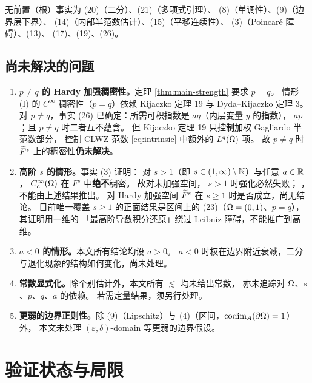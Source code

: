 无前置（根）事实为
(20)（二分）、(21)（多项式引理）、
(8)（单调性）、(9)（边界层下界）、
(14)（内部半范数估计）、(15)（平移连续性）、
(3)（Poincaré 障碍）、(13)、
(17)、(19)、(26)。

\subsection{尚未解决的问题}

\begin{enumerate}
\item \textbf{$p\neq q$ 的 Hardy 加强稠密性。}定理 \ref{thm:main-strength} 要求 $p=q$。
情形 (I) 的 $C^\infty$ 稠密性（$p=q$）依赖 Kijaczko 定理 19 与 Dyda--Kijaczko 定理 3。
对 $p\neq q$，事实 (26) 已确定：所需可积指数是 $aq$（内层变量 $y$ 的指数），
 $ap$；且 $p\neq q$ 时二者互不蕴含。
但 Kijaczko 定理 19 只控制加权 Gagliardo 半范数部分，
控制 CLWZ 范数 \eqref{eq:intrinsic} 中额外的 $L^q(\Omega)$ 项。
故 $p\neq q$ 时 $\widetilde F^s$ 上的稠密性\textbf{仍未解决}。

\item \textbf{高阶 $s$ 的情形。}事实 (3) 证明：
对 $s>1$（即 $s\in(1,\infty)\setminus\mathbb{N}$）与任意 $a\in\mathbb{R}$，
$C_c^\infty(\Omega)$ 在 $F^s$ 中\textbf{绝不}稠密。
故对未加强空间， $s>1$ 时强化必然失败；
，不能由上述结果推出。
对 Hardy 加强空间 $\widetilde F^s$ 在 $s\ge1$ 时是否成立，尚无结论。
目前唯一覆盖 $s\ge1$ 的正面结果是区间上的
(23)（$\Omega=(0,1)$、$p=q$），其证明用一维的
「最高阶导数积分还原」绕过 Leibniz 障碍，不能推广到高维。

\item \textbf{$a<0$ 的情形。}本文所有结论均设 $a>0$。
$a<0$ 时权在边界附近衰减，二分与退化现象的结构如何变化，尚未处理。

\item \textbf{常数显式化。}除个别估计外，本文所有 $\lesssim$ 均未给出常数，
亦未追踪对 $\Omega$、$s$、$p$、$q$、$a$ 的依赖。
若需定量结果，须另行处理。

\item \textbf{更弱的边界正则性。}除 (9)（Lipschitz）与
(4)（区间，$\operatorname{codim}_{A}(\partial\Omega)=1$）外，
本文未处理 $(\varepsilon,\delta)$-domain 等更弱的边界假设。
\end{enumerate}

\section{验证状态与局限}\label{sec:limits}

